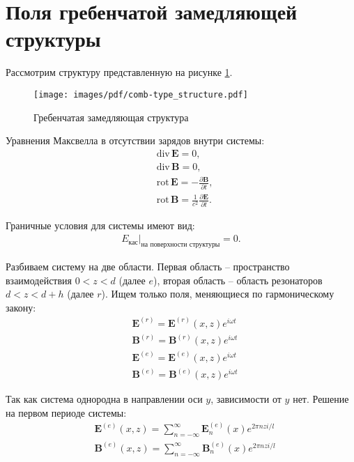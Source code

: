 \documentclass[a4paper,12pt]{extarticle} %
\newcommand{\dff}[2]{\frac{\partial #1}{\partial #2}}
\renewcommand{\vec}[1]{\bm{#1}}
\renewcommand{\div}{\mathrm{div}\,}
\newcommand{\rot}{\mathrm{rot}\,}
\begin{document}
\section{Поля гребенчатой замедляющей структуры}

Рассмотрим структуру представленную на рисунке \ref{ris1}.

\begin{figure}[ht]\label{ris1}
	\centering
	\texttt{[image: images/pdf/comb-type\_structure.pdf]}
	\caption{Гребенчатая замедляющая структура}
\end{figure}

Уравнения Максвелла в отсутствии зарядов внутри системы:
\begin{align*}
	& \div \vec{E} = 0, \\
	& \div \vec{B} = 0, \\
	& \rot \vec{E} = - \dff{\vec{B}}{t}, \\
	& \rot \vec{B} = \frac{1}{c^2}\dff{\vec{E}}{t}.
\end{align*}

Граничные условия для системы имеют вид:
\begin{align*}
	E_\text{кас}\Big|_{\text{на поверхности структуры}} = 0.
\end{align*}

Разбиваем систему на две области. Первая область -- пространство взаимодействия $0<z<d$ (далее $e$), вторая область -- область резонаторов $d<z<d+h$ (далее $r$). Ищем только поля, меняющиеся по гармоническому закону:
\begin{align*}
	& \vec{E}^{(r)} = \vec{E}^{(r)}(x, z) e^{i \omega t} \\
	& \vec{B}^{(r)} = \vec{B}^{(r)}(x, z) e^{i \omega t} \\
	& \vec{E}^{(e)} = \vec{E}^{(e)}(x, z) e^{i \omega t} \\
	& \vec{B}^{(e)} = \vec{B}^{(e)}(x, z) e^{i \omega t}
\end{align*}

Так как система однородна в направлении оси $y$, зависимости от $y$ нет. Решение на первом периоде системы:
\begin{align*}
& \vec{E}^{(e)}(x, z) = \sum_{n = -\infty}^{\infty} \vec{E}^{(e)}_n(x) e^{2\pi n z i /l} \\
& \vec{B}^{(e)}(x, z) = \sum_{n = -\infty}^{\infty} \vec{B}^{(e)}_n(x) e^{2\pi n z i /l}
\end{align*}
\end{document}
